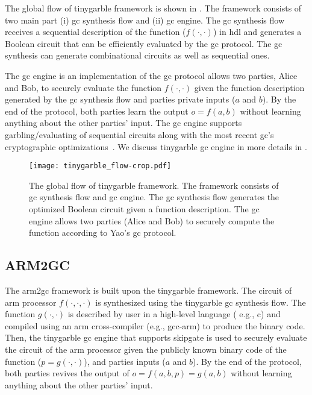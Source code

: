 The global flow of \gls{tinygarble} framework is shown in .
The framework consists of two main part (i) \acrshort{gc} synthesis flow and (ii) \acrshort{gc} engine.
The \acrshort{gc} synthesis flow receives a sequential description of the function ($f(\cdot, \cdot)$) in \acrshort{hdl} and generates a Boolean circuit that can be efficiently evaluated by the \acrshort{gc} protocol.
The \acrshort{gc} synthesis can generate combinational circuits as well as sequential ones.

The \acrshort{gc} engine is an implementation of the \acrshort{gc} protocol allows two parties, Alice and Bob, to securely evaluate the function $f(\cdot,\cdot)$ given the function description generated by the \acrshort{gc} synthesis flow and parties private inputs ($a$ and $b$).
By the end of the protocol, both parties learn the output $o = f(a, b)$ without learning anything about the other parties' input.
The \acrshort{gc} engine supports garbling/evaluating of sequential circuits along with the most recent \acrshort{gc}'s cryptographic optimizations~\cite{kolesnikov2008improved, bellare2013efficient, zahur2015two}.
We discuss \gls{tinygarble} \acrshort{gc} engine in more details in .

\begin{figure}
\centering
\texttt{[image: tinygarble\_flow-crop.pdf]}
\caption{The global flow of \gls{tinygarble} framework.
The framework consists of \acrshort{gc} synthesis flow and \acrshort{gc} engine.
The \acrshort{gc} synthesis flow generates the optimized Boolean circuit given a function description.
The \acrshort{gc} engine allows two parties (Alice and Bob) to securely compute the function according to Yao's \acrshort{gc} protocol.
}
\label{fig:tinygarbel-global-flow}
\end{figure}

\subsection{ARM2GC}
The \gls{arm2gc} framework is built upon the \gls{tinygarble} framework.
The circuit of \gls{arm} processor $f(\cdot,\cdot,\cdot)$ is synthesized using the \gls{tinygarble} \acrshort{gc} synthesis flow.
The function $g(\cdot,\cdot)$ is described by user in a high-level language ( e.g., \gls{c}) and compiled using an \gls{arm} cross-compiler (e.g., gcc-arm) to produce the binary code.
Then, the \gls{tinygarble} \acrshort{gc} engine that supports skipgate is used to securely evaluate the circuit of the \gls{arm} processor given the publicly known binary code of the function ($p=g(\cdot,\cdot)$), and parties inputs ($a$ and $b$).
By the end of the protocol, both parties revives the output of $o = f(a,b,p) = g(a,b)$ without learning anything about the other parties' input.

